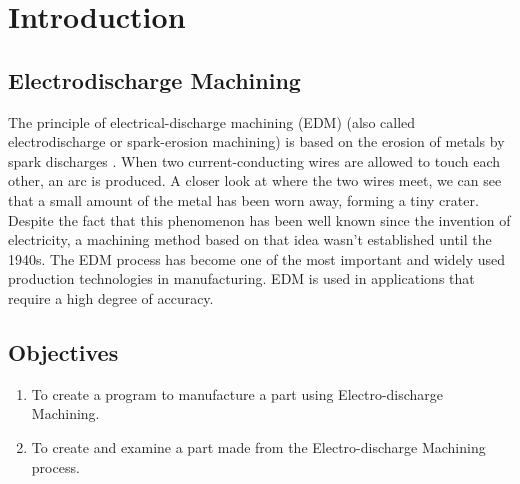 \section{Introduction}
\lhead{\leftmark}
\label{sec:introduction}
\subsection{Electrodischarge Machining}
The principle of electrical-discharge machining (EDM) (also called electrodischarge or spark-erosion machining) is based on the erosion of metals by spark discharges \cite{classnotes}. When two current-conducting wires are allowed to touch each other, an arc is produced. A closer look at where the two wires meet, we can see that a small amount of the metal has been worn away, forming a tiny crater.\\
Despite the fact that this phenomenon has been well known since the invention of electricity, a machining method based on that idea wasn't established until the 1940s. The EDM process has become one of the most important and widely used production technologies in manufacturing\cite{youssef2020non}. EDM is used in applications that require a high degree of accuracy\cite{youssef2020non}.
\subsection{Objectives}
\begin{enumerate}
\item To create a program to manufacture a part using Electro-discharge Machining.
\item To create and examine a part made from the Electro-discharge Machining process.
\end{enumerate}
